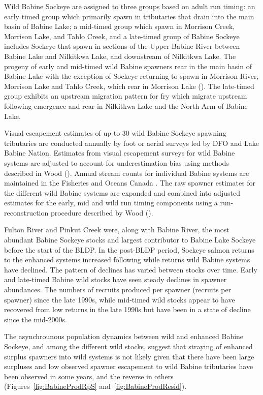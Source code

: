 \documentclass[french,11pt]{book}
\begin{document}
Wild Babine Sockeye are assigned to three groups based on adult run timing: an early timed group which primarily spawn in tributaries that drain into the main basin of Babine Lake; a mid-timed group which spawn in Morrison Creek, Morrison Lake, and Tahlo Creek, and a late-timed group of Babine Sockeye includes Sockeye that spawn in sections of the Upper Babine River between Babine Lake and Nilkitkwa Lake, and downstream of Nilkitkwa Lake. The progeny of early and mid-timed wild Babine spawners rear in the main basin of Babine Lake with the exception of Sockeye returning to spawn in Morrison River, Morrison Lake and Tahlo Creek, which rear in Morrison Lake (). The late-timed group exhibits an upstream migration pattern for fry which migrate upstream following emergence and rear in Nilkitkwa Lake and the North Arm of Babine Lake.

Visual escapement estimates of up to 30 wild Babine Sockeye spawning tributaries are conducted annually by foot or aerial surveys led by DFO and Lake Babine Nation. Estimates from visual escapement surveys for wild Babine systems are adjusted to account for underestimation bias using methods described in Wood (). Annual stream counts for individual Babine systems are maintained in the Fisheries and Oceans Canada . The raw spawner estimates for the different wild Babine systems are expanded and combined into adjusted estimates for the early, mid and wild run timing components using a run-reconstruction procedure described by Wood ().

Fulton River and Pinkut Creek were, along with Babine River, the most abundant Babine Sockeye stocks and largest contributor to Babine Lake Sockeye before the start of the BLDP. In the post-BLDP period, Sockeye salmon returns to the enhanced systems increased following while returns wild Babine systems have declined. The pattern of declines has varied between stocks over time. Early and late-timed Babine wild stocks have seen steady declines in spawner abundances. The numbers of recruits produced per spawner (recruits per spawner) since the late 1990s, while mid-timed wild stocks appear to have recovered from low returns in the late 1990s but have been in a state of decline since the mid-2000s.

The asynchrounous population dynamics between wild and enhanced Babine Sockeye, and among the different wild stocks, suggest that straying of enhanced surplus spawners into wild systems is not likely given that there have been large surpluses and low observed spawner escapement to wild Babine tributaries have been observed in some years, and the reverse in others (Figures~\ref{fig:BabineProdRpS} and~\ref{fig:BabineProdResid}).
\end{document}
